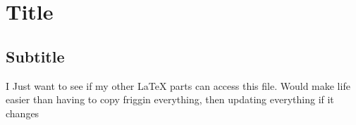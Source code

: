 \documentclass{book}
\begin{document}
\section{Title}

\subsection{Subtitle}

I Just want to see if my other LaTeX parts can access this file. Would make life easier than having to copy friggin everything, then updating everything if it changes
\end{document}
